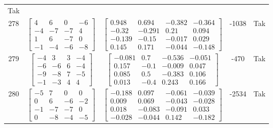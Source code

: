 \documentclass[a4paper,12pt]{article}
\begin{document}
\begin{tabular}{c c c c c}
Tak
\\
278
&
$\begin{bmatrix} 4 & 6 & 0 & -6 \\ -4 & -7 & -7 & 4 \\ 1 & 6 & -7 & 0 \\ -1 & -4 & -6 & -8 \end{bmatrix}$
&
$\begin{bmatrix} 0.948 & 0.694 & -0.382 & -0.364 \\ -0.32 & -0.291 & 0.21 & 0.094 \\ -0.139 & -0.15 & -0.017 & 0.029 \\ 0.145 & 0.171 & -0.044 & -0.148 \end{bmatrix}$
&
-1038
&
Tak
\\
279
&
$\begin{bmatrix} -4 & 3 & 3 & -4 \\ -6 & -6 & 6 & -4 \\ -9 & -8 & 7 & -5 \\ -1 & -3 & 4 & 4 \end{bmatrix}$
&
$\begin{bmatrix} -0.081 & 0.7 & -0.536 & -0.051 \\ 0.157 & -0.1 & -0.009 & 0.047 \\ 0.085 & 0.5 & -0.383 & 0.106 \\ 0.013 & -0.4 & 0.243 & 0.166 \end{bmatrix}$
&
-470
&
Tak
\\
280
&
$\begin{bmatrix} -5 & 7 & 0 & 0 \\ 0 & 6 & -6 & -2 \\ -1 & -7 & -7 & 0 \\ 0 & -8 & -4 & -5 \end{bmatrix}$
&
$\begin{bmatrix} -0.188 & 0.097 & -0.061 & -0.039 \\ 0.009 & 0.069 & -0.043 & -0.028 \\ 0.018 & -0.083 & -0.091 & 0.033 \\ -0.028 & -0.044 & 0.142 & -0.182 \end{bmatrix}$
&
-2534
&
Tak
\\
\end{tabular} \egroup \newpage
\end{document}
